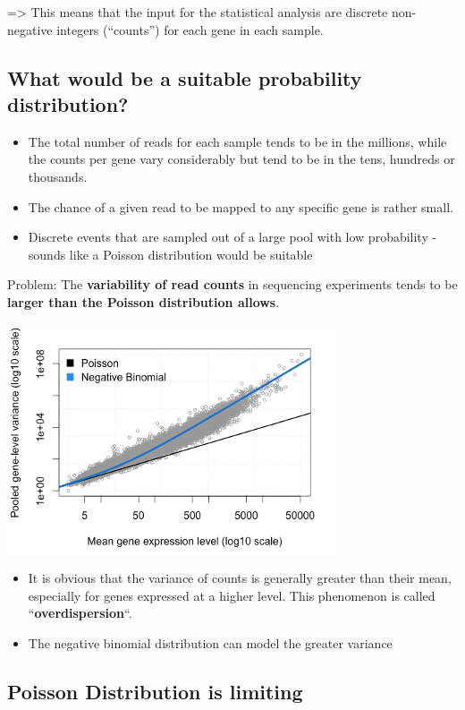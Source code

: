 \documentclass[
]{book}
\providecommand{\tightlist}{%
  \setlength{\itemsep}{0pt}\setlength{\parskip}{0pt}}
\begin{document}
=\textgreater{} This means that the input for the statistical analysis are discrete non-negative integers (``counts'') for each gene in each sample.

\hypertarget{what-would-be-a-suitable-probability-distribution}{%
\subsection{What would be a suitable probability distribution?}\label{what-would-be-a-suitable-probability-distribution}}

\begin{itemize}
\tightlist
\item
  The total number of reads for each sample tends to be in the millions, while the counts per gene vary considerably but tend to be in the tens, hundreds or thousands.
\item
  The chance of a given read to be mapped to any specific gene is rather small.
\item
  Discrete events that are sampled out of a large pool with low probability - sounds like a Poisson distribution would be suitable
\end{itemize}

Problem: The \textbf{variability of read counts} in sequencing experiments tends to be \textbf{larger than the Poisson distribution allows}.

\includegraphics[width=0.5\linewidth]{./2_67}

\begin{itemize}
\tightlist
\item
  It is obvious that the variance of counts is generally greater than their mean, especially for genes expressed at a higher level. This phenomenon is called ``\textbf{overdispersion}``.
\item
  The negative binomial distribution can model the greater variance
\end{itemize}

\hypertarget{poisson-distribution-is-limiting}{%
\subsection{Poisson Distribution is limiting}\label{poisson-distribution-is-limiting}}
\end{document}
